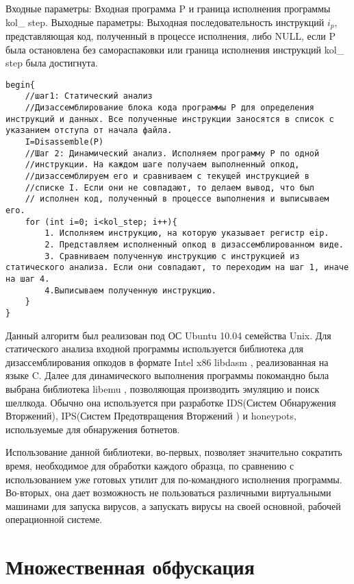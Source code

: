\documentclass[oneside, final, 14pt]{extreport}
\begin{document}
Входные параметры: Входная программа P и граница исполнения программы kol\_ step.
Выходные параметры: Выходная последовательность инструкций \(i_p\), представляющая код, полученный в процессе исполнения, либо NULL, если P была остановлена без самораспаковки или граница исполнения инструкций kol\_ step была достигнута.
\begin{verbatim}
begin{
    //шаг1: Статический анализ
    //Дизассемблирование блока кода программы P для определения инструкций и данных. Все полученные инструкции заносятся в список с указанием отступа от начала файла.
    I=Disassemble(P)
    //Шаг 2: Динамический анализ. Исполняем программу P по одной 
    //инструкции. На каждом шаге получаем выполненный опкод, 
    //дизассемблируем его и сравниваем с текущей инструкцией в 
    //списке I. Если они не совпадают, то делаем вывод, что был
    // исполнен код, полученный в процессе выполнения и выписываем его.
    for (int i=0; i<kol_step; i++){
        1. Исполняем инструкцию, на которую указывает регистр eip.
        2. Представляем исполненный опкод в дизассемблированном виде.
        3. Сравниваем полученную инструкцию с инструкцией из статического анализа. Если они совпадают, то переходим на шаг 1, иначе на шаг 4.
        4.Выписываем полученную инструкцию.
    }
}
\end{verbatim}
Данный алгоритм был реализован под ОС Ubuntu 10.04 семейства Unix. Для статического анализа входной программы используется библиотека для дизассемблирования опкодов в формате  Intel x86 libdasm \cite{libdasm}, реализованная на языке C. Далее для динамического выполнения программы покомандно была выбрана библиотека  libemu \cite{libemu}, позволяющая производить эмуляцию и поиск шеллкода. Обычно она используется при разработке IDS(Систем Обнаружения Вторжений), IPS(Систем Предотвращения Вторжений ) и honeypots, используемые для обнаружения ботнетов. 

Использование данной библиотеки, во-первых, позволяет значительно сократить время, необходимое для обработки каждого образца, по сравнению с использованием уже готовых утилит для по-командного исполнения программы. Во-вторых, она дает возможность не пользоваться различными виртуальными машинами для запуска вирусов, а запускать вирусы на своей основной, рабочей операционной системе.

\section{Множественная обфускация}
\end{document}
